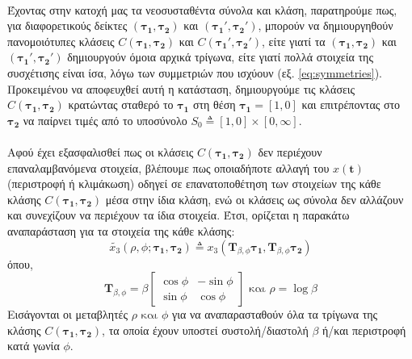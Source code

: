 \paragraph*{}
Έχοντας στην κατοχή μας τα νεοσυσταθέντα σύνολα και κλάση, παρατηρούμε πως, για διαφορετικούς δείκτες $(\boldsymbol{\tau_1},\boldsymbol{\tau_2})$ και $(\boldsymbol{\tau_1}',\boldsymbol{\tau_2}')$, μπορούν να δημιουργηθούν πανομοιότυπες κλάσεις $C(\boldsymbol{\tau_1},\boldsymbol{\tau_2})$ και $C(\boldsymbol{\tau_1}',\boldsymbol{\tau_2}')$, είτε γιατί τα $(\boldsymbol{\tau_1},\boldsymbol{\tau_2})$ και $(\boldsymbol{\tau_1}',\boldsymbol{\tau_2}')$ δημιουργούν όμοια αρχικά τρίγωνα, είτε γιατί πολλά στοιχεία της συσχέτισης είναι ίσα, λόγω των συμμετριών που ισχύουν (εξ. \ref{eq:symmetries}). Προκειμένου να αποφευχθεί αυτή η κατάσταση, δημιουργούμε τις κλάσεις $C(\boldsymbol{\tau_1},\boldsymbol{\tau_2})$ κρατώντας σταθερό το $\boldsymbol{\tau_1}$ στη θέση $\boldsymbol{\tau_1} = [1,0]$ και επιτρέποντας στο $\boldsymbol{\tau_2}$ να παίρνει τιμές από το υποσύνολο $S_0 \triangleq [1,0]\times[0,\infty]$.

\paragraph*{}
Αφού έχει εξασφαλισθεί πως οι κλάσεις $C(\boldsymbol{\tau_1},\boldsymbol{\tau_2})$ δεν περιέχουν επαναλαμβανόμενα στοιχεία, βλέπουμε πως οποιαδήποτε αλλαγή του $x(\textbf{t})$ (περιστροφή ή κλιμάκωση) οδηγεί σε επανατοποθέτηση των στοιχείων της κάθε κλάσης $C(\boldsymbol{\tau_1},\boldsymbol{\tau_2})$ μέσα στην ίδια κλάση, ενώ οι κλάσεις ως σύνολα δεν αλλάζουν και συνεχίζουν να περιέχουν τα ίδια στοιχεία. Έτσι, ορίζεται η παρακάτω αναπαράσταση για τα στοιχεία της κάθε κλάσης:
\begin{equation}\label{eq:x3tilde}
\tilde{x_3}(\rho,\phi;\boldsymbol{\tau_1},\boldsymbol{\tau_2}) \triangleq x_3(\textbf{T}_{\beta,\phi}\boldsymbol{\tau_1},\textbf{T}_{\beta,\phi}\boldsymbol{\tau_2})
\end{equation}
όπου,
\begin{equation}
\textbf{T}_{\beta,\phi} = \beta\begin{bmatrix} \cos\phi & -\sin\phi \\ \sin\phi & \cos\phi \end{bmatrix} \text{ και } \rho = \log\beta \nonumber
\end{equation}
Εισάγονται οι μεταβλητές $\rho \text{ και } \phi$ για να αναπαρασταθούν όλα τα τρίγωνα της κλάσης $C(\boldsymbol{\tau_1},\boldsymbol{\tau_2})$, τα οποία έχουν υποστεί συστολή/διαστολή $\beta$ ή/και περιστροφή κατά γωνία $\phi$.

